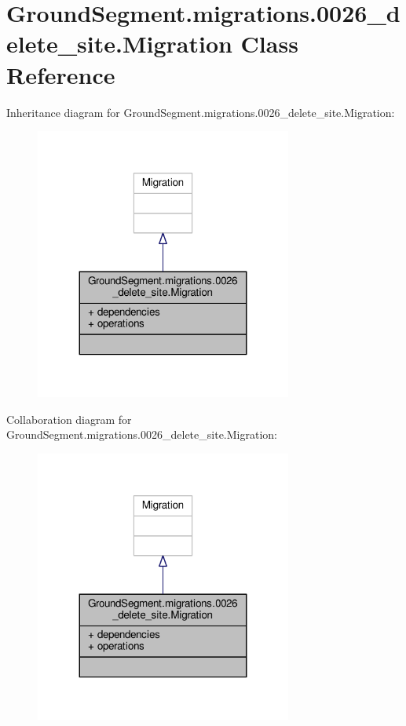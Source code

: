 \hypertarget{class_ground_segment_1_1migrations_1_10026__delete__site_1_1_migration}{}\section{Ground\+Segment.\+migrations.0026\+\_\+delete\+\_\+site.Migration Class Reference}
\label{class_ground_segment_1_1migrations_1_10026__delete__site_1_1_migration}


Inheritance diagram for Ground\+Segment.\+migrations.0026\+\_\+delete\+\_\+site.Migration\+:\nopagebreak
\begin{figure}[H]
\begin{center}
\leavevmode
\includegraphics[width=239pt]{class_ground_segment_1_1migrations_1_10026__delete__site_1_1_migration__inherit__graph}
\end{center}
\end{figure}


Collaboration diagram for Ground\+Segment.\+migrations.0026\+\_\+delete\+\_\+site.Migration\+:\nopagebreak
\begin{figure}[H]
\begin{center}
\leavevmode
\includegraphics[width=239pt]{class_ground_segment_1_1migrations_1_10026__delete__site_1_1_migration__coll__graph}
\end{center}
\end{figure}
